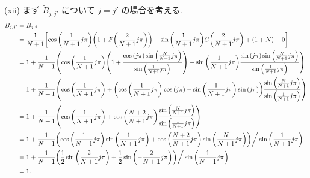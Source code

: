 \documentclass[uplatex,dvipdfmx,a4paper,11pt]{jlreq}
\theoremstyle{definition}
\begin{document}
(xii) まず $\tilde{B}_{j,j'}$ について $j = j'$ の場合を考える.
\begin{align}
  \tilde{B}_{j,j'} & = \tilde{B}_{j,j}                                                                                                                                                                                                                                      \\
                   & = \frac{1}{N+1}\qty[\cos\qty(\frac{1}{N+1}j\pi)\qty(1 + F\qty(\frac{2}{N+1}j\pi)) - \sin\qty(\frac{1}{N+1}j\pi)G\qty(\frac{2}{N+1}j\pi) + \qty(1 + N) - 0]                                                                                             \\
                   & = 1 + \frac{1}{N+1}\qty(\cos\qty(\frac{1}{N+1}j\pi)\qty(1 + \frac{\cos\qty(j\pi)\sin\qty(\frac{N}{N+1}j\pi)}{\sin\qty(\frac{1}{N+1}j\pi)}) - \sin\qty(\frac{1}{N+1}j\pi)\frac{\sin\qty(j\pi)\sin\qty(\frac{N}{N+1}j\pi)}{\sin\qty(\frac{1}{N+1}j\pi)}) \\
                   & = 1 + \frac{1}{N+1}\qty(\cos\qty(\frac{1}{N+1}j\pi) + \qty(\cos\qty(\frac{1}{N+1}j\pi)\cos\qty(j\pi) - \sin\qty(\frac{1}{N+1}j\pi)\sin\qty(j\pi))\frac{\sin\qty(\frac{N}{N+1}j\pi)}{\sin\qty(\frac{1}{N+1}j\pi)})                                      \\
                   & = 1 + \frac{1}{N+1}\qty(\cos\qty(\frac{1}{N+1}j\pi) + \cos\qty(\frac{N+2}{N+1}j\pi)\frac{\sin\qty(\frac{N}{N+1}j\pi)}{\sin\qty(\frac{1}{N+1}j\pi)})                                                                                                    \\
                   & = 1 + \frac{1}{N+1}\qty(\cos\qty(\frac{1}{N+1}j\pi)\sin\qty(\frac{1}{N+1}j\pi) + \cos\qty(\frac{N+2}{N+1}j\pi)\sin\qty(\frac{N}{N+1}j\pi))\bigg/\sin\qty(\frac{1}{N+1}j\pi)                                                                            \\
                   & = 1 + \frac{1}{N+1}\qty(\frac{1}{2}\sin\qty(\frac{2}{N+1}j\pi) + \frac{1}{2}\sin\qty(-\frac{2}{N+1}j\pi))\bigg/\sin\qty(\frac{1}{N+1}j\pi)                                                                                                             \\
                   & = 1.
\end{align}
\end{document}
